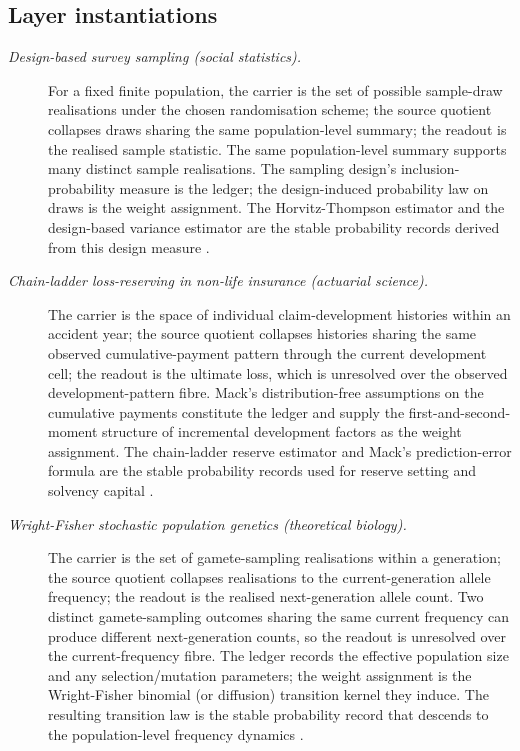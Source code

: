 \documentclass[11pt]{article}
\theoremstyle{definition}
\begin{document}
\subsection*{Layer instantiations}\label{layer-inst:F23}

\begin{description}
\item[\emph{Design-based survey sampling (social
statistics).}]
For a fixed finite population, the carrier is the set of
possible sample-draw realisations under the chosen
randomisation scheme; the source quotient collapses
draws sharing the same population-level summary; the
readout is the realised sample statistic.  The same
population-level summary supports many distinct sample
realisations.  The sampling design's inclusion-probability
measure is the ledger; the design-induced probability
law on draws is the weight assignment.  The
Horvitz-Thompson estimator and the design-based variance
estimator are the stable probability records derived
from this design measure
\citep{Cochran1977SamplingTechniques}.

\item[\emph{Chain-ladder loss-reserving in non-life
insurance (actuarial science).}]
The carrier is the space of individual
claim-development histories within an accident year;
the source quotient collapses histories sharing the
same observed cumulative-payment pattern through the
current development cell; the readout is the ultimate
loss, which is unresolved over the observed
development-pattern fibre.  Mack's distribution-free
assumptions on the cumulative payments constitute the
ledger and supply the first-and-second-moment structure
of incremental development factors as the weight
assignment.  The chain-ladder reserve estimator and
Mack's prediction-error formula are the stable
probability records used for reserve setting and
solvency capital \citep{Mack1993ChainLadder}.

\item[\emph{Wright-Fisher stochastic population genetics
(theoretical biology).}]
The carrier is the set of gamete-sampling realisations
within a generation; the source quotient collapses
realisations to the current-generation allele frequency;
the readout is the realised next-generation allele
count.  Two distinct gamete-sampling outcomes sharing
the same current frequency can produce different
next-generation counts, so the readout is unresolved
over the current-frequency fibre.  The ledger records
the effective population size and any
selection/mutation parameters; the weight assignment is
the Wright-Fisher binomial (or diffusion) transition
kernel they induce.  The resulting transition law is
the stable probability record that descends to the
population-level frequency dynamics
\citep{Wright1931Evolution}.


\end{description}
\end{document}
